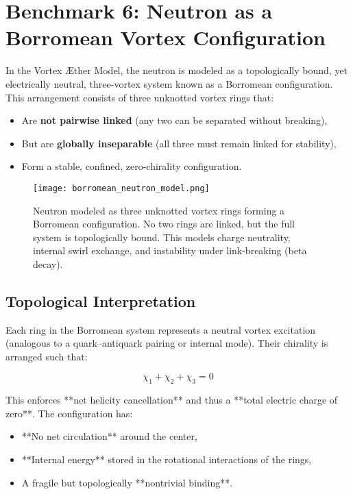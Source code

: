 \section{Benchmark 6: Neutron as a Borromean Vortex Configuration}

In the Vortex Æther Model, the neutron is modeled as a topologically bound, yet electrically neutral, three-vortex system known as a Borromean configuration. This arrangement consists of three unknotted vortex rings that:

\begin{itemize}
    \item Are \textbf{not pairwise linked} (any two can be separated without breaking),
    \item But are \textbf{globally inseparable} (all three must remain linked for stability),
    \item Form a stable, confined, zero-chirality configuration.
\end{itemize}

\begin{figure}[H]
    \centering
    \texttt{[image: borromean\_neutron\_model.png]}
    \caption{Neutron modeled as three unknotted vortex rings forming a Borromean configuration. No two rings are linked, but the full system is topologically bound. This models charge neutrality, internal swirl exchange, and instability under link-breaking (beta decay).}
\end{figure}

\subsection{Topological Interpretation}

Each ring in the Borromean system represents a neutral vortex excitation (analogous to a quark–antiquark pairing or internal mode). Their chirality is arranged such that:

\[
\chi_1 + \chi_2 + \chi_3 = 0
\]

This enforces **net helicity cancellation** and thus a **total electric charge of zero**. The configuration has:

\begin{itemize}
    \item **No net circulation** around the center,
    \item **Internal energy** stored in the rotational interactions of the rings,
    \item A fragile but topologically **nontrivial binding**.
\end{itemize}

